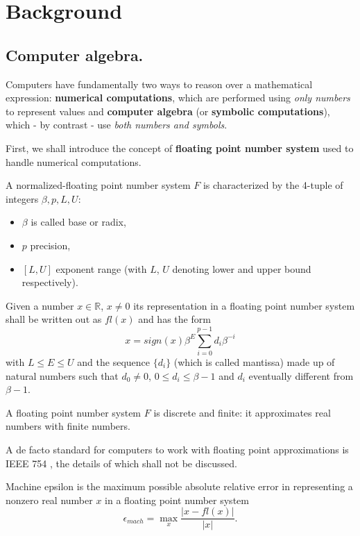 \section{Background}
\subsection*{Computer algebra.}
Computers have fundamentally two ways to reason over a mathematical expression: \textbf{numerical computations}, which are performed
using \textit{only numbers} to represent values and \textbf{computer algebra} (or \textbf{symbolic computations}), which - by
contrast - use \textit{both numbers and symbols}.

First, we shall introduce the concept of \textbf{floating point number system} used to handle numerical computations.
\begin{definition}
    A normalized-floating point number system \(F\) is characterized by the 4-tuple of integers \(\beta, p, L, U\):
    \begin{itemize}[topsep=0pt, itemsep=0pt, parsep=0pt]
        \item \(\beta\) is called base or radix,
        \item \(p\) precision,
        \item \([L, U]\) exponent range (with \(L\), \(U\) denoting lower and upper bound respectively).
    \end{itemize}
    Given a number \(x \in \mathbb{R}\), \(x \neq 0\) its representation in a floating point number system shall be written out as
    \(fl(x)\) and has the form
    \[x = sign(x) \beta^E \sum_{i=0}^{p-1}d_{i}\beta^{-i}\]
    with \(L \leq E \leq U\) and the sequence \(\{d_{i}\}\) (which is called mantissa) made up of natural numbers such that
    \(d_{0} \neq 0\), \(0 \leq d_{i} \leq \beta - 1\) and \(d_{i}\) eventually different from \(\beta - 1\).
\end{definition}
\begin{remark}
    A floating point number system \(F\) is discrete and finite: it approximates real numbers with finite numbers.
\end{remark}

A de facto standard for computers to work with floating point approximations is IEEE 754 \cite{ieeefp}, the details of which shall not be
discussed.

\begin{definition}
    Machine epsilon is the maximum possible absolute relative error in representing a nonzero real number \(x\) in a floating point
    number system
    \[\epsilon_{mach} = \max \limits_{x} \dfrac{\vert x - fl(x) \vert}{\vert x \vert}.\]
\end{definition}

